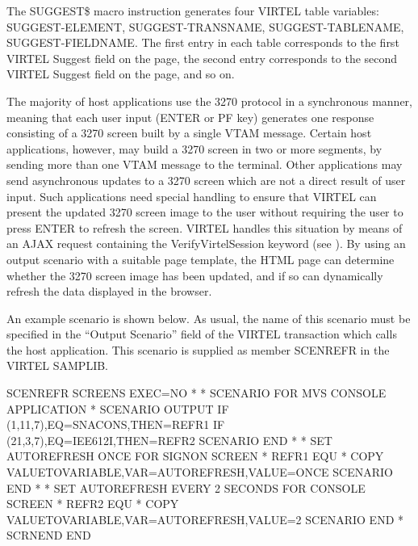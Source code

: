 \documentclass[letterpaper,10pt,english]{sphinxmanual}
\begin{document}

The SUGGEST\$ macro instruction generates four VIRTEL table variables: SUGGEST-ELEMENT, SUGGEST-TRANSNAME,
SUGGEST-TABLENAME, SUGGEST-FIELDNAME. The first entry in each table corresponds to the first VIRTEL Suggest field
on the page, the second entry corresponds to the second VIRTEL Suggest field on the page, and so on.


The majority of host applications use the 3270 protocol in a synchronous manner, meaning that each user input
(ENTER or PF key) generates one response consisting of a 3270 screen built by a single VTAM message. Certain host
applications, however, may build a 3270 screen in two or more segments, by sending more than one VTAM message to
the terminal. Other applications may send asynchronous updates to a 3270 screen which are not a direct result of user
input. Such applications need special handling to ensure that VIRTEL can present the updated 3270 screen image to
the user without requiring the user to press ENTER to refresh the screen. VIRTEL handles this situation by means of an
AJAX request containing the VerifyVirtelSession keyword (see {\hyperref[\detokenize{User_Guide:v457ug-session-management}]{}}). By using an
output scenario with a suitable page template, the HTML page can determine whether the 3270 screen image has
been updated, and if so can dynamically refresh the data displayed in the browser.

An example scenario is shown below. As usual, the name of this scenario must be specified in the “Output Scenario”
field of the VIRTEL transaction which calls the host application. This scenario is supplied as member SCENREFR in the VIRTEL SAMPLIB.

\begin{sphinxVerbatim}[commandchars=\\\{\}]
SCENREFR    SCREENS EXEC=NO
*
* SCENARIO FOR MVS CONSOLE APPLICATION
*
            SCENARIO OUTPUT
            IF\PYGZdl{} (1,11,7),EQ=\PYGZsq{}SNACONS\PYGZsq{},THEN=REFR1
            IF\PYGZdl{} (21,3,7),EQ=\PYGZsq{}IEE612I\PYGZsq{},THEN=REFR2
            SCENARIO END
*
* SET AUTOREFRESH ONCE FOR SIGNON SCREEN
*
REFR1       EQU *
            COPY\PYGZdl{} VALUE\PYGZhy{}TO\PYGZhy{}VARIABLE,VAR=\PYGZsq{}AUTOREFRESH\PYGZsq{},VALUE=\PYGZsq{}ONCE\PYGZsq{}
            SCENARIO END
*
* SET AUTOREFRESH EVERY 2 SECONDS FOR CONSOLE SCREEN
*
REFR2       EQU *
            COPY\PYGZdl{} VALUE\PYGZhy{}TO\PYGZhy{}VARIABLE,VAR=\PYGZsq{}AUTOREFRESH\PYGZsq{},VALUE=\PYGZsq{}2\PYGZsq{}
            SCENARIO END
*
            SCRNEND
            END
\end{sphinxVerbatim}
\end{document}

